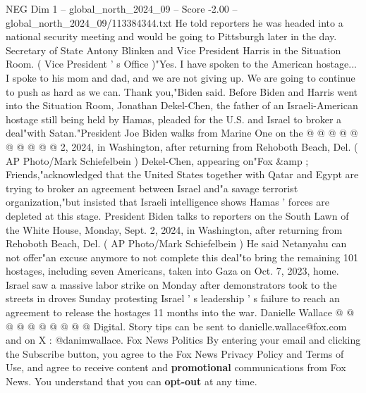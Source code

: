 \begin{textsample}{NEG Dim 1 – global\_north\_2024\_09 – Score -2.00 – global\_north\_2024\_09/113384344.txt}
He told reporters he was headed into a national security meeting and would be going to Pittsburgh later in the day.
Secretary of State Antony Blinken and Vice President Harris in the Situation Room. ( Vice President ' s Office )"Yes.
I have spoken to the American hostage...
I spoke to his mom and dad, and we are not giving up.
We are going to continue to push as hard as we can.
Thank you,"Biden said.
Before Biden and Harris went into the Situation Room, Jonathan Dekel-Chen, the father of an Israeli-American hostage still being held by Hamas, pleaded for the U.S. and Israel to broker a deal"with Satan."President Joe Biden walks from Marine One on the @ @ @ @ @ @ @ @ @ @ 2, 2024, in Washington, after returning from Rehoboth Beach, Del. ( AP Photo/Mark Schiefelbein ) Dekel-Chen, appearing on"Fox \&amp ; Friends,"acknowledged that the United States together with Qatar and Egypt are trying to broker an agreement between Israel and"a savage terrorist organization,"but insisted that Israeli intelligence shows Hamas ' forces are depleted at this stage.
President Biden talks to reporters on the South Lawn of the White House, Monday, Sept. 2, 2024, in Washington, after returning from Rehoboth Beach, Del. ( AP Photo/Mark Schiefelbein ) He said Netanyahu can not offer"an excuse anymore to not complete this deal"to bring the remaining 101 hostages, including seven Americans, taken into Gaza on Oct. 7, 2023, home.
Israel saw a massive labor strike on Monday after demonstrators took to the streets in droves Sunday protesting Israel ' s leadership ' s failure to reach an agreement to release the hostages 11 months into the war.
Danielle Wallace @ @ @ @ @ @ @ @ @ @ Digital.
Story tips can be sent to danielle.wallace@fox.com and on X : @danimwallace.
Fox News Politics By entering your email and clicking the Subscribe button, you agree to the Fox News Privacy Policy and Terms of Use, and agree to receive content and \textbf{promotional} communications from Fox News.
You understand that you can \textbf{opt-out} at any time.

\end{textsample}
